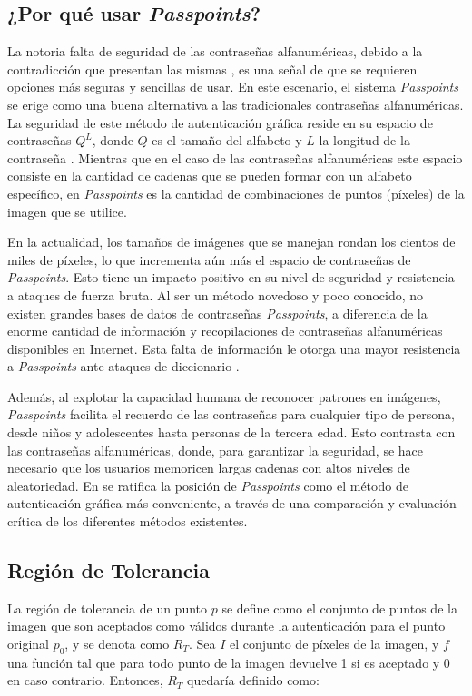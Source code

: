 \subsection{¿Por qué usar \textit{Passpoints}?}

La notoria falta de seguridad de las contraseñas alfanuméricas, debido a la contradicción que presentan las mismas \cite{zimmermann2020password}, es una señal de que se requieren opciones más seguras y sencillas de usar. En este escenario, el sistema \textit{Passpoints} se erige como una buena alternativa a las tradicionales contraseñas alfanuméricas. La seguridad de este método de autenticación gráfica reside en su espacio de contraseñas \( Q^L \), donde \( Q \) es el tamaño del alfabeto y \( L \) la longitud de la contraseña \cite{legon2019nuevo}. Mientras que en el caso de las contraseñas alfanuméricas este espacio consiste en la cantidad de cadenas que se pueden formar con un alfabeto específico, en \textit{Passpoints} es la cantidad de combinaciones de puntos (píxeles) de la imagen que se utilice.

En la actualidad, los tamaños de imágenes que se manejan rondan los cientos de miles de píxeles, lo que incrementa aún más el espacio de contraseñas de \textit{Passpoints}. Esto tiene un impacto positivo en su nivel de seguridad y resistencia a ataques de fuerza bruta. Al ser un método novedoso y poco conocido, no existen grandes bases de datos de contraseñas \textit{Passpoints}, a diferencia de la enorme cantidad de información y recopilaciones de contraseñas alfanuméricas disponibles en Internet. Esta falta de información le otorga una mayor resistencia a \textit{Passpoints} ante ataques de diccionario \cite{weakpassw}.

Además, al explotar la capacidad humana de reconocer patrones en imágenes, \textit{Passpoints} facilita el recuerdo de las contraseñas para cualquier tipo de persona, desde niños y adolescentes hasta personas de la tercera edad. Esto contrasta con las contraseñas alfanuméricas, donde, para garantizar la seguridad, se hace necesario que los usuarios memoricen largas cadenas con altos niveles de aleatoriedad. En \cite{rodriguez2018seguridad} se ratifica la posición de \textit{Passpoints} como el método de autenticación gráfica más conveniente, a través de una comparación y evaluación crítica de los diferentes métodos existentes.

\subsection{Región de Tolerancia}
La región de tolerancia \cite{legon2019nuevo, borrego2018debilidades} de un punto \(p\) se define como el conjunto de puntos de la imagen que son aceptados como válidos durante la autenticación para el punto original \(p_0\), y se denota como \(R_T\). Sea \(I\) el conjunto de píxeles de la imagen, y \(f\) una función tal que para todo punto de la imagen devuelve 1 si es aceptado y 0 en caso contrario. Entonces, \(R_T\) quedaría definido como:

